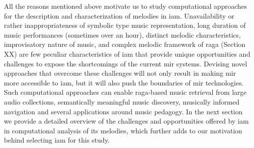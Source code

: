 
All the reasons mentioned above  motivate us to study computational approaches for the description and characterization of melodies in \gls{iam}. Unavailability or rather inappropriateness of symbolic type music representation, long duration of music performances (sometimes over an hour), distinct melodic characteristics, improvisatory nature of music, and complex melodic framework of \gls{raga} (Section XX) are few peculiar characteristics of \gls{iam} that provide unique opportunities and challenges to expose the shortcomings of the current \gls{mir} systems. Devising novel approaches that overcome these challenges will not only result in making \gls{mir} more accessible to \gls{iam}, but it will also push the boundaries of \gls{mir} technologies. Such computational approaches can enable \gls{raga}-based music retrieval from large audio collections, semantically meaningful music discovery, musically informed navigation and several applications around music pedagogy. In the next section we provide a detailed overview of the challenges and opportunities offered by \gls{iam} in computational analysis of its melodies, which further adds to our motivation behind selecting \gls{iam} for this study.







